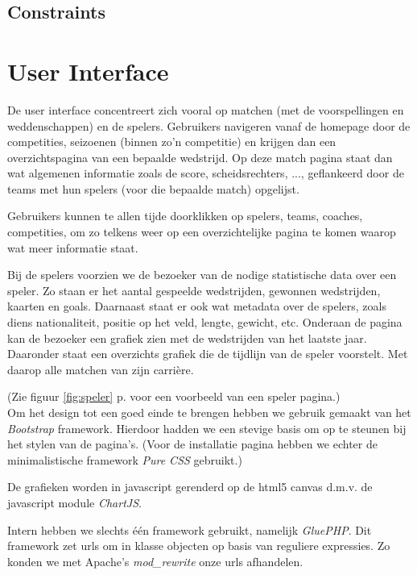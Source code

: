 \documentclass[11pt]{article}
\begin{document}
\subsection{Constraints}





\section{User Interface}


De user interface concentreert zich vooral op matchen (met de voorspellingen en weddenschappen) en de spelers.
Gebruikers navigeren vanaf de homepage door de competities, seizoenen (binnen zo'n competitie) en krijgen dan een overzichtspagina van een bepaalde wedstrijd.
Op deze match pagina staat dan wat algemenen informatie zoals de score, scheidsrechters, ..., geflankeerd door de teams met hun spelers (voor die bepaalde match) opgelijst.

Gebruikers kunnen te allen tijde doorklikken op spelers, teams, coaches, competities, om zo telkens weer op een overzichtelijke pagina te komen waarop wat meer informatie staat.

Bij de spelers voorzien we de bezoeker van de nodige statistische data over een speler. Zo staan er het aantal gespeelde wedstrijden, gewonnen wedstrijden, kaarten en goals. Daarnaast staat er ook wat metadata over de spelers, zoals diens nationaliteit, positie op het veld, lengte, gewicht, etc.
Onderaan de pagina kan de bezoeker een grafiek zien met de wedstrijden van het laatste jaar. Daaronder staat een overzichts grafiek die de tijdlijn van de speler voorstelt. Met daarop alle matchen van zijn carri\`ere.

(Zie figuur \ref{fig:speler} p. \pageref{fig:speler} voor een voorbeeld van een speler pagina.)\\

Om het design tot een goed einde te brengen hebben we gebruik gemaakt van het \emph{Bootstrap} 
framework. Hierdoor hadden we een stevige basis om op te steunen bij het stylen van de pagina's. (Voor de installatie pagina hebben we echter de minimalistische framework \emph{Pure CSS} gebruikt.)

De grafieken worden in javascript gerenderd op de html5 canvas d.m.v. de javascript module \emph{ChartJS}.

Intern hebben we slechts \'e\'en framework gebruikt, namelijk \emph{GluePHP}. Dit framework zet urls om in klasse objecten op basis van reguliere expressies. Zo konden we met Apache's \emph{mod\_rewrite} onze urls afhandelen.
\end{document}
